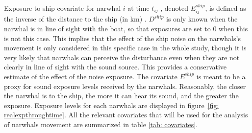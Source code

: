 \documentclass[11pt]{article}
\newcommand {\1}{\mathbb{1}}
\begin{document}

Exposure to ship covariate for narwhal $i$ at time $t_{ij}$ , denoted $E^{ship}_{ij}$, is defined as the inverse of the distance to the ship (in km) \cite{heide-jorgensen_behavioral_2021}.
$D^{ship}$ is only known when the narwhal is in line of sight with the boat, so that exposures are set to $0$ when this is not this case. This implies that the effect of the ship noise on the narwhals's movement is only considered in this specific case in the whole study, though it is very likely that narwhals can perceive the disturbance even when they are not clearly in line of sight with the sound source. This provides a conservative estimate of the effect of the noise exposure. The covariate $E^{ship}$ is meant to be a proxy for sound exposure levels received by the narwhals. Reasonably, the closer the narwhal is to the ship, the more it can hear its sound, and the greater the exposure. Exposure levels for each narwhals are displayed in figure~\ref{fig: realexpthroughtime}. All the relevant covariates that will be used for the analysis of narwhals movement are summarized in table \ref{tab: covariates}.
\end{document}
